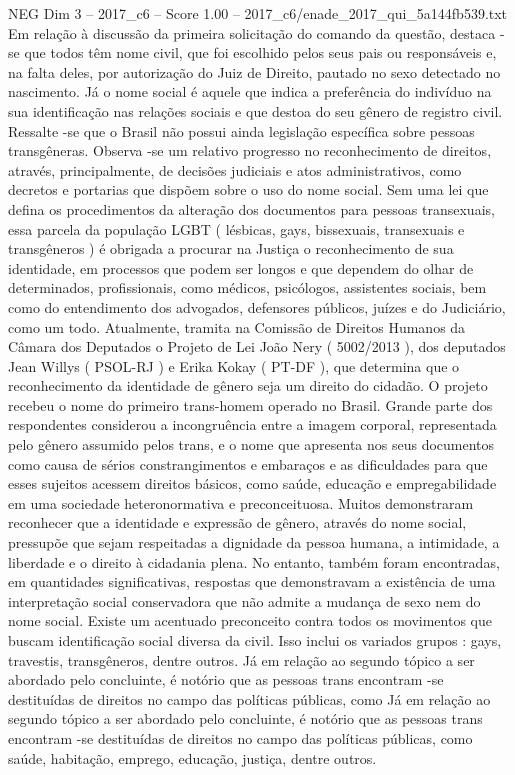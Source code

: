 \begin{textsample}{NEG Dim 3 – 2017\_c6 – Score 1.00 – 2017\_c6/enade\_2017\_qui\_5a144fb539.txt}
Em relação à discussão da primeira solicitação do comando da questão, destaca -se que todos têm nome civil, que foi escolhido pelos seus pais ou responsáveis e, na falta deles, por autorização do Juiz de Direito, pautado no sexo detectado no nascimento.
Já o nome social é aquele que indica a preferência do indivíduo na sua identificação nas relações sociais e que destoa do seu gênero de registro civil.
Ressalte -se que o Brasil não possui ainda legislação específica sobre pessoas transgêneras.
Observa -se um relativo progresso no reconhecimento de direitos, através, principalmente, de decisões judiciais e atos administrativos, como decretos e portarias que dispõem sobre o uso do nome social.
Sem uma lei que defina os procedimentos da alteração dos documentos para pessoas transexuais, essa parcela da população LGBT ( lésbicas, gays, bissexuais, transexuais e transgêneros ) é obrigada a procurar na Justiça o reconhecimento de sua identidade, em processos que podem ser longos e que dependem do olhar de determinados, profissionais, como médicos, psicólogos, assistentes sociais, bem como do entendimento dos advogados, defensores públicos, juízes e do Judiciário, como um todo.
Atualmente, tramita na Comissão de Direitos Humanos da Câmara dos Deputados o Projeto de Lei João Nery ( 5002/2013 ), dos deputados Jean Willys ( PSOL-RJ ) e Erika Kokay ( PT-DF ), que determina que o reconhecimento da identidade de gênero seja um direito do cidadão.
O projeto recebeu o nome do primeiro trans-homem operado no Brasil.
Grande parte dos respondentes considerou a incongruência entre a imagem corporal, representada pelo gênero assumido pelos trans, e o nome que apresenta nos seus documentos como causa de sérios constrangimentos e embaraços e as dificuldades para que esses sujeitos acessem direitos básicos, como saúde, educação e empregabilidade em uma sociedade heteronormativa e preconceituosa.
Muitos demonstraram reconhecer que a identidade e expressão de gênero, através do nome social, pressupõe que sejam respeitadas a dignidade da pessoa humana, a intimidade, a liberdade e o direito à cidadania plena.
No entanto, também foram encontradas, em quantidades significativas, respostas que demonstravam a existência de uma interpretação social conservadora que não admite a mudança de sexo nem do nome social.
Existe um acentuado preconceito contra todos os movimentos que buscam identificação social diversa da civil.
Isso inclui os variados grupos : gays, travestis, transgêneros, dentre outros.
Já em relação ao segundo tópico a ser abordado pelo concluinte, é notório que as pessoas trans encontram -se destituídas de direitos no campo das políticas públicas, como Já em relação ao segundo tópico a ser abordado pelo concluinte, é notório que as pessoas trans encontram -se destituídas de direitos no campo das políticas públicas, como saúde, habitação, emprego, educação, justiça, dentre outros.

\end{textsample}
